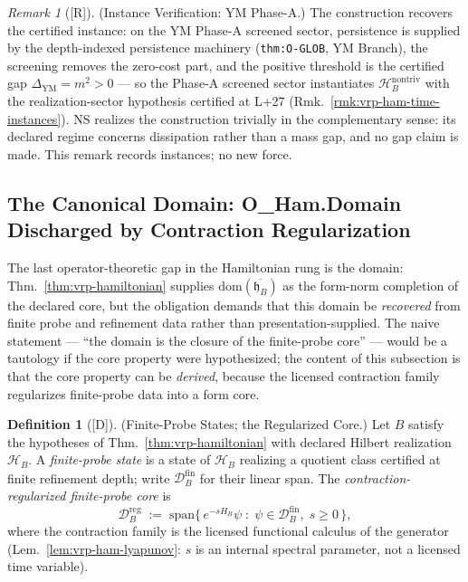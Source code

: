 \documentclass[12pt,oneside]{amsbook}
\theoremstyle{plain}
\theoremstyle{definition}
\newtheorem{definition}[theorem]{Definition}
\theoremstyle{remark}
\newtheorem{remark}[theorem]{Remark}
\newcommand{\status}[1]{\textup{[#1]}}
\begin{document}
\begin{remark}[\status{R}]\label{rmk:vrp-mass-sector-instances}
\textup{(Instance Verification: YM Phase-A.)}
The construction recovers the certified instance: on the YM
Phase-A screened sector, persistence is supplied by the
depth-indexed persistence machinery (\texttt{thm:O-GLOB}, YM
Branch), the screening removes the zero-cost part, and the
positive threshold is the certified gap
$\Delta_{\mathrm{YM}} = m^2 > 0$ --- so the Phase-A screened
sector instantiates
$\mathcal{H}_B^{\mathrm{nontriv}}$ with the realization-sector
hypothesis certified at L+27
(Rmk.~\ref{rmk:vrp-ham-time-instances}).  NS realizes the
construction trivially in the complementary sense: its declared
regime concerns dissipation rather than a mass gap, and no gap
claim is made.  This remark records instances; no new force.
\end{remark}

\subsection{The Canonical Domain: O\_Ham.Domain Discharged by
Contraction Regularization}
\label{sec:vrp-ham-domain}

The last operator-theoretic gap in the Hamiltonian rung is the
domain: Thm.~\ref{thm:vrp-hamiltonian} supplies
$\mathrm{dom}(\overline{\mathfrak{h}_B})$ as the form-norm
completion of the declared core, but the obligation demands that
this domain be \emph{recovered} from finite probe and refinement
data rather than presentation-supplied.  The naive statement ---
``the domain is the closure of the finite-probe core'' --- would be
a tautology if the core property were hypothesized; the content of
this subsection is that the core property can be \emph{derived},
because the licensed contraction family regularizes finite-probe
data into a form core.

\begin{definition}[\status{D}]\label{def:vrp-finite-probe-core}
\textup{(Finite-Probe States; the Regularized Core.)}
Let $B$ satisfy the hypotheses of Thm.~\ref{thm:vrp-hamiltonian}
with declared Hilbert realization $\mathcal{H}_B$.  A
\emph{finite-probe state} is a state of $\mathcal{H}_B$ realizing
a quotient class certified at finite refinement depth; write
$\mathcal{D}_B^{\mathrm{fin}}$ for their linear span.  The
\emph{contraction-regularized finite-probe core} is
\[
  \mathcal{D}_B^{\mathrm{reg}} \;:=\;
  \mathrm{span}\bigl\{\, e^{-sH_B}\psi \;:\;
  \psi \in \mathcal{D}_B^{\mathrm{fin}},\; s \ge 0 \,\bigr\},
\]
where the contraction family is the licensed functional calculus
of the generator (Lem.~\ref{lem:vrp-ham-lyapunov}: $s$ is an
internal spectral parameter, not a licensed time variable).
\end{definition}
\end{document}
